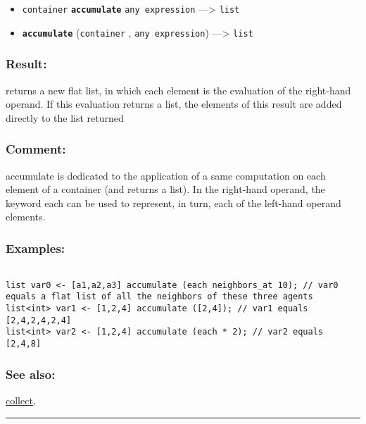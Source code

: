 \documentclass[]{book}
\providecommand{\tightlist}{%
  \setlength{\itemsep}{0pt}\setlength{\parskip}{0pt}}
\theoremstyle{definition}
\theoremstyle{definition}
\theoremstyle{definition}
\theoremstyle{remark}
\begin{document}
\begin{itemize}
\tightlist
\item
  \texttt{container} \textbf{\texttt{accumulate}}
  \texttt{any\ expression} ---\textgreater{} \texttt{list}
\item
  \textbf{\texttt{accumulate}} (\texttt{container} ,
  \texttt{any\ expression}) ---\textgreater{} \texttt{list}
\end{itemize}

\subsubsection{Result:}\label{result-16}

returns a new flat list, in which each element is the evaluation of the
right-hand operand. If this evaluation returns a list, the elements of
this result are added directly to the list returned

\subsubsection{Comment:}\label{comment-2}

accumulate is dedicated to the application of a same computation on each
element of a container (and returns a list). In the right-hand operand,
the keyword each can be used to represent, in turn, each of the
left-hand operand elements.

\subsubsection{Examples:}\label{examples-13}

\begin{verbatim}
 
list var0 <- [a1,a2,a3] accumulate (each neighbors_at 10); // var0 equals a flat list of all the neighbors of these three agents 
list<int> var1 <- [1,2,4] accumulate ([2,4]); // var1 equals [2,4,2,4,2,4] 
list<int> var2 <- [1,2,4] accumulate (each * 2); // var2 equals [2,4,8]
\end{verbatim}

\subsubsection{See also:}\label{see-also-14}

\href{operators-b-to-c.html\#collect}{collect},

\begin{center}\rule{0.5\linewidth}{\linethickness}\end{center}
\end{document}

